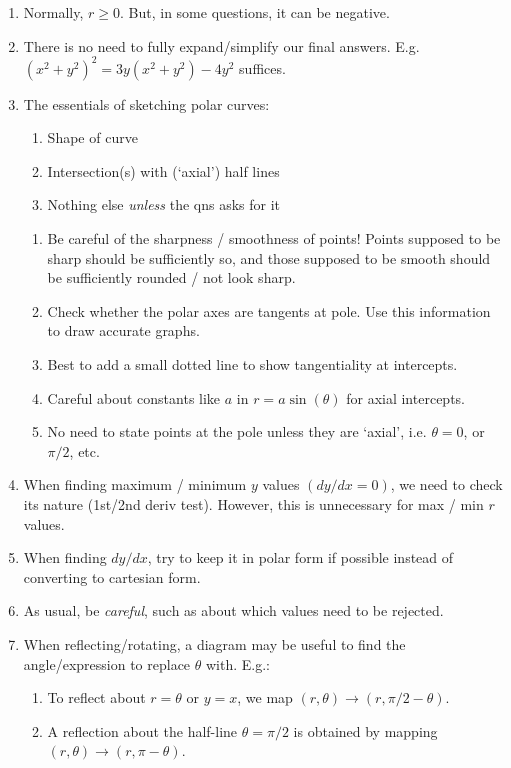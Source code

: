 \documentclass[oneside]{book}
\begin{document}
\begin{IN}
  \begin{enumerate}
    \item Normally, \(r\geq 0\). But, in some questions, it can be negative.
    \item There is no need to fully expand/simplify our final answers. E.g. \((x^2+y^2)^2=3y(x^2+y^2)-4y^2\) suffices.
    \item The essentials of sketching polar curves:
    \begin{enumerate}
      \item Shape of curve
      \item Intersection(s) with (`axial') half lines
      \item Nothing else \emph{unless} the qns asks for it
    \end{enumerate}
    \begin{enumerate}[label=\(\qed\)]
      \item Be careful of the sharpness / smoothness of points! Points supposed to be sharp should be sufficiently so, and those supposed to be smooth should be sufficiently rounded / not look sharp.
      \item Check whether the polar axes are tangents at pole. Use this information to draw accurate graphs.
      \item Best to add a small dotted line to show tangentiality at intercepts.
      \item Careful about constants like \(a\) in \(r=a\sin(\theta)\) for axial intercepts.
      \item No need to state points at the pole unless they are `axial', i.e. \(\theta=0\), or \(\pi/2\), etc.
    \end{enumerate}
    \item When finding maximum / minimum \(y\) values \(\left(dy/dx=0\right)\), we need to check its nature (1st/2nd deriv test). However, this is unnecessary for max / min \(r\) values.
    \item When finding \(dy/dx\), try to keep it in polar form if possible instead of converting to cartesian form.
    \item As usual, be \emph{careful}, such as about which values need to be rejected.
    \item When reflecting/rotating, a diagram may be useful to find the angle/expression to replace \(\theta\) with. E.g.: \small
    \begin{enumerate}
      \item To reflect about \(r=\theta\) or \(y=x\), we map \((r,\theta) \to (r,\pi/2-\theta)\).
      \item A reflection about the half-line \(\theta=\pi/2\) is obtained by mapping \((r,\theta) \to (r,\pi-\theta)\).
    \end{enumerate} \normalsize
  \end{enumerate}
\end{IN}
\end{document}

